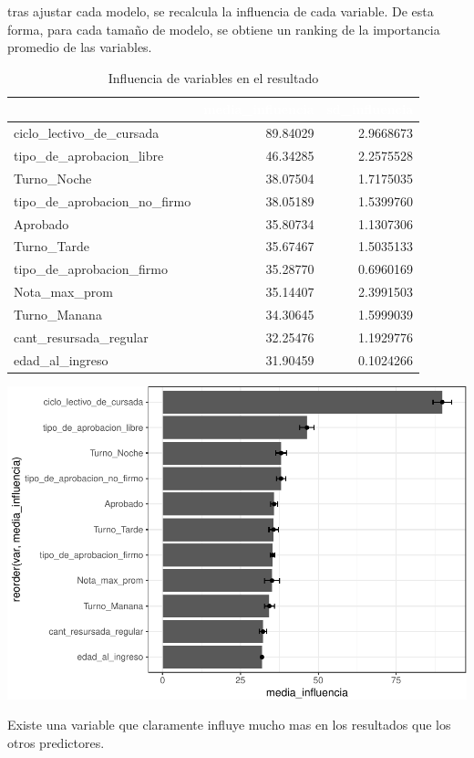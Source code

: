 \documentclass[]{article}
\begin{document}
tras ajustar cada modelo, se recalcula la influencia de cada variable.
De esta forma, para cada tamaño de modelo, se obtiene un ranking de la
importancia promedio de las variables.

\begin{table}[!h]

\caption{\label{tab:tf_rfe_influencia_variables}Influencia de variables en el resultado}
\centering
\begin{tabular}[t]{lrr}
\toprule
\rowcolor{black}  \multicolumn{1}{c}{\textcolor{white}{\textbf{var}}} & \multicolumn{1}{c}{\textcolor{white}{\textbf{media\_influencia}}} & \multicolumn{1}{c}{\textcolor{white}{\textbf{sd\_influencia}}}\\
\midrule
\rowcolor{gray!6}  ciclo\_lectivo\_de\_cursada & 89.84029 & 2.9668673\\
tipo\_de\_aprobacion\_libre & 46.34285 & 2.2575528\\
\rowcolor{gray!6}  Turno\_Noche & 38.07504 & 1.7175035\\
tipo\_de\_aprobacion\_no\_firmo & 38.05189 & 1.5399760\\
\rowcolor{gray!6}  Aprobado & 35.80734 & 1.1307306\\
\addlinespace
Turno\_Tarde & 35.67467 & 1.5035133\\
\rowcolor{gray!6}  tipo\_de\_aprobacion\_firmo & 35.28770 & 0.6960169\\
Nota\_max\_prom & 35.14407 & 2.3991503\\
\rowcolor{gray!6}  Turno\_Manana & 34.30645 & 1.5999039\\
cant\_resursada\_regular & 32.25476 & 1.1929776\\
\addlinespace
\rowcolor{gray!6}  edad\_al\_ingreso & 31.90459 & 0.1024266\\
\bottomrule
\end{tabular}
\end{table}

\includegraphics{analisis_de_variables_files/figure-latex/influencia_de_variables-1.pdf}

Existe una variable que claramente influye mucho mas en los resultados
que los otros predictores.
\end{document}
